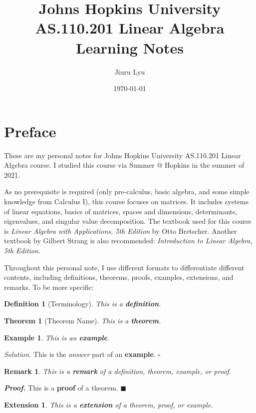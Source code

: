 \documentclass[12pt, a4paper]{article}
\title{Johns Hopkins University\\\textbf{AS.110.201 Linear Algebra}\\Learning Notes}
\author{Jiuru Lyu}
\date{\today}
\newtheorem{thm}{Theorem}[subsection]
\newtheorem{df}{Definition}[subsection]
\newtheorem{eg}{Example}[subsection]
\newenvironment*{sol}{\indent\textit{Solution. }}{\hfill{$\square$}\par}
\newtheorem*{rmk}{\indent Remark}
\newenvironment*{prf}{\indent\textbf{\textit{Proof. }}}{\hfill $\blacksquare$\par}
\newtheorem*{ext}{\indent Extension}
\begin{document}
\maketitle

\tableofcontents

\newpage
\section*{Preface}
These are my personal notes for Johns Hopkins University AS.110.201 Linear Algebra course. I studied this course via Summer @ Hopkins in the summer of 2021. 

As no prerequisite is required (only pre-calculus, basic algebra, and some simple knowledge from Calculus I), this course focuses on matrices. It includes systems of linear equations, basics of matrices, spaces and dimensions, determinants, eigenvalues, and singular value decomposition. The textbook used for this course is \textit{Linear Algebra with Applications, 5th Edition} by Otto Bretscher. Another textbook by Gilbert Strang is also recommended: \textit{Introduction to Linear Algebra, 5th Edition}. 

Throughout this personal note, I use different formats to differentiate different contents, including definitions, theorems, proofs, examples, extensions, and remarks. To be more specific: 
\begin{df}[Terminology]
    This is a \textbf{definition}.	
\end{df}
\begin{thm}[Theorem Name]
    This is a \textbf{theorem}.	
\end{thm}
\begin{eg}
    This is  an \textbf{example}. 
\end{eg}

\begin{sol}
    This is the \textit{answer} part of an \textbf{example}. 
\end{sol}
\begin{rmk}
	This is a \textbf{remark} of a definition, theorem, example, or proof. 
\end{rmk}

\begin{prf}
	This is a \textbf{proof} of a theorem. 
\end{prf}
\begin{ext}
	This is a \textbf{extension} of a theorem, proof, or example. 	
\end{ext}
\end{document}
